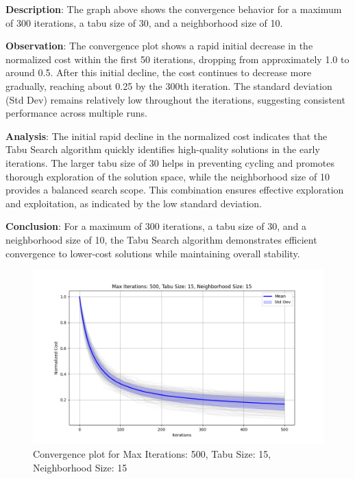 \documentclass[
]{article}
\begin{document}
    \textbf{Description}: The graph above shows the convergence behavior for a maximum of 300 iterations, a tabu size of 30, and a neighborhood size of 10.

    \textbf{Observation}: The convergence plot shows a rapid initial decrease in the normalized cost within the first 50 iterations, dropping from approximately 1.0 to around 0.5. After this initial decline, the cost continues to decrease more gradually, reaching about 0.25 by the 300th iteration. The standard deviation (Std Dev) remains relatively low throughout the iterations, suggesting consistent performance across multiple runs.

    \textbf{Analysis}: The initial rapid decline in the normalized cost indicates that the Tabu Search algorithm quickly identifies high-quality solutions in the early iterations. The larger tabu size of 30 helps in preventing cycling and promotes thorough exploration of the solution space, while the neighborhood size of 10 provides a balanced search scope. This combination ensures effective exploration and exploitation, as indicated by the low standard deviation.

    \textbf{Conclusion}: For a maximum of 300 iterations, a tabu size of 30, and a neighborhood size of 10, the Tabu Search algorithm demonstrates efficient convergence to lower-cost solutions while maintaining overall stability.



    \begin{figure}[H]
        \centering
        \includegraphics{tabu_search/max_iter_500_tabu_size_15_neighborhood_size_15}
        \caption{Convergence plot for Max Iterations: 500, Tabu Size: 15, Neighborhood Size: 15}
        \label{fig:ts_500_15_15}
    \end{figure}
\end{document}

